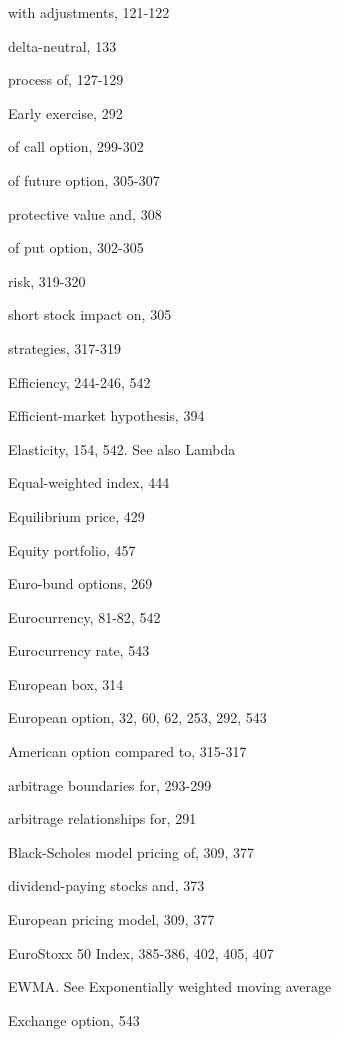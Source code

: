 \noindent with adjustments, 121-122\par
\noindent delta-neutral, 133\par
\noindent process of, 127-129\par
\noindent Early exercise, 292\par
\noindent of call option, 299-302\par
\noindent of future option, 305-307\par
\noindent protective value and, 308\par
\noindent of put option, 302-305\par
\noindent risk, 319-320\par
\noindent short stock impact on, 305\par
\noindent strategies, 317-319\par
\noindent Efficiency, 244-246, 542\par
\noindent Efficient-market hypothesis, 394\par
\noindent Elasticity, 154, 542. See also Lambda\par
\noindent Equal-weighted index, 444\par
\noindent Equilibrium price, 429\par
\noindent Equity portfolio, 457\par
\noindent Euro-bund options, 269\par
\noindent Eurocurrency, 81-82, 542\par
\noindent Eurocurrency rate, 543\par
\noindent European box, 314\par
\noindent European option, 32, 60, 62, 253, 292, 543\par
\noindent American option compared to, 315-317\par
\noindent arbitrage boundaries for, 293-299\par
\noindent arbitrage relationships for, 291\par
\noindent Black-Scholes model pricing of, 309, 377\par
\noindent dividend-paying stocks and, 373\par
\noindent European pricing model, 309, 377\par
\noindent EuroStoxx 50 Index, 385-386, 402, 405, 407\par
\noindent EWMA. See Exponentially weighted moving average\par
\noindent Exchange option, 543\par

